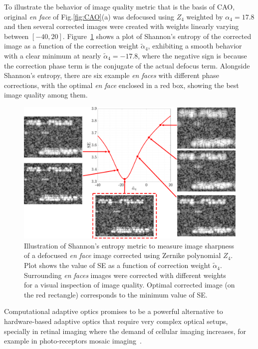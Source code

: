 To illustrate the behavior of image quality metric that is the basis of CAO, original \textit{en face} of Fig.\ref{fig:CAO}(a) was defocused using $Z_4$ weighted by $\alpha_4=17.8$ and then several corrected images were created with weights linearly varying between $[-40, 20]$. Figure~\ref{fig:Sharpness} shows a plot of Shannon's entropy of the corrected image as a function of the correction weight $\tilde{\alpha}_4$, exhibiting a smooth behavior with a clear minimum at nearly $\tilde{\alpha}_4=-17.8$, where the negative sign is because the correction phase term is the conjugate of the actual defocus term. Alongside Shannon's entropy, there are six example \textit{en faces} with different phase corrections, with the optimal \textit{en face} enclosed in a red box, showing the best image quality among them.

\begin{figure}[htb!]
	\centering
	\includegraphics[width=\textwidth]{Figures/TheoreticalBasis/SharpnessCAO.pdf}
	\caption[Illustration of Shannon's entropy metric.]{Illustration of Shannon's entropy metric to measure image sharpness of a defocused \textit{en face} image corrected using Zernike polynomial $Z_4$. Plot shows the value of SE as a function of correction weight $\tilde{\alpha}_4$. Surrounding \textit{en faces} images were corrected with different weights for a visual inspection of image quality. Optimal corrected image (on the red rectangle) corresponds to the minimum value of SE.}
	\label{fig:Sharpness}
\end{figure}

Computational adaptive optics promises to be a powerful alternative to hardware-based adaptive optics that require very complex optical setups, specially in retinal imaging where the demand of cellular imaging increases, for example in photo-receptors mosaic imaging~\cite{Kumar2017_Invivo, Hillmann2016_Aberrationfree, South2018_Combined}.

